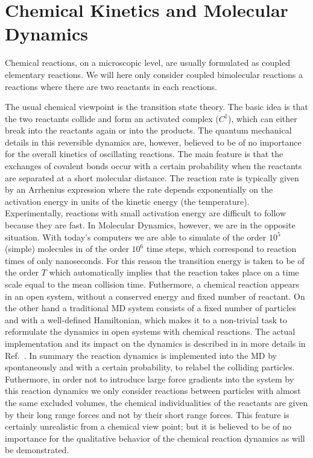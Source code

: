 \section{Chemical Kinetics and Molecular Dynamics}
Chemical reactions, on a microscopic level, are usually formulated as
coupled  elementary reactions. We will here only consider coupled
bimolecular reactions \ie a reactions where there are two reactants
in each reactions. 

The usual chemical viewpoint is the transition state theory. The basic idea
is that the two reactants collide and form an activated complex ($C^{\ddag}$),
which can either break into the reactants again or into the products.
The quantum mechanical details in this reversible dynamics are,
however, believed to be of no importance for the overall kinetics of
oscillating reactions. The main feature is that the exchanges of
covalent bonds occur with a certain probability when the reactants
are separated at a short molecular distance.  
The reaction rate is typically given by an Arrhenius expression where
the rate depends exponentially on the activation energy in units of
the kinetic energy (the temperature). Experimentally, reactions
with small activation energy are difficult to follow because they are
fast. In Molecular Dynamics, however, we are in the opposite
situation. With today's computers we are able to simulate of the order
$10^{5}$ (simple) molecules in of the order ${10^{6}}$ 
time steps, which correspond to reaction times of only nanoseconds. 
For this reason the transition energy is taken to be of the order
$T$ which automatically implies that the reaction takes place on a
time scale equal to the mean collision time. Futhermore, a chemical
reaction appears in an open system, \ie without 
a conserved energy and fixed number of reactant. On the other hand a
traditional MD system consists of a fixed number of particles 
and with a well-defined Hamiltonian, which makes it to a non-trivial
task to reformulate the dynamics in open systems with chemical
reactions. The actual implementation and its impact on 
the dynamics is described in in more details in Ref.\ \cite{tox2}.
In summary the reaction dynamics is implemented into the MD 
by spontaneously  and with a certain probability, to relabel the
colliding particles. Futhermore, in order not to introduce large force
gradients into the system by this reaction dynamics we only consider 
reactions between particles with almost the same excluded volumes,
\ie the chemical individualities of the reactants are given by their
long range forces and not by their short range forces.  
This feature is certainly unrealistic from a chemical view point; but
it is believed to be of no importance for the qualitative behavior of
the chemical reaction dynamics as will be demonstrated.


